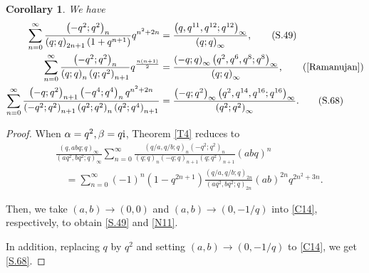 \documentclass[reqno,12pt]{amsart}
\newtheorem{corollary}[theorem]{Corollary}
\theoremstyle{remark}
\numberwithin{equation}{section}
\begin{document}
%
\begin{corollary}
We have
\begin{align}
\sum_{n=0}^{\infty}\frac{\left(-q^2;q^2\right)_n}{\left(q;q\right)_{2n+1}\left(1+q^{n+1}\right)}q^{n^2+2n}
&=\frac{\left(q,q^{11},q^{12};q^{12}\right)_{\infty}}{\left(q;q\right)_{\infty}},
\tag{S.49}
\label{S.49}\\
\sum_{n=0}^{\infty}\frac{\left(-q^2;q^2\right)_n}{\left(q;q\right)_n\left(q;q^2\right)_{n+1}}q^{\frac{n\left(n+1\right)}{2}}
&=\frac{\left(-q;q\right)_{\infty}\left(q^2,q^6,q^8;q^8\right)_{\infty}}{\left(q;q\right)_{\infty}},\tag{\rm{\cite[Entry. 1.7.5]{Ramanujan}}}\label{N11}\\
\sum_{n=0}^{\infty}\frac{\left(-q;q^2\right)_{n+1}\left(-q^4;q^4\right)_n
q^{n^2+2n}}
{\left(-q^2;q^2\right)_{n+1}\left(q^2;q^2\right)_n\left(q^2;q^4\right)_{n+1}}
&=\frac{\left(-q;q^2\right)_{\infty}\left(q^2,q^{14},q^{16};q^{16}\right)_{\infty}}
{\left(q^2;q^2\right)_{\infty}}.\tag{S.68}\label{S.68}
\end{align}
\end{corollary}
\begin{proof}
When $\alpha=q^2,\beta=q{\rm i}$, Theorem \ref{T4} reduces to 
\begin{align}
&\frac{\left(q,abq;q\right)_{\infty}}{\left(aq^2,bq^2;q\right)_{\infty}}
\sum_{n=0}^{\infty}\frac{\left(q/a,q/b;q\right)_n\left(-q^2;q^2\right)_n}
{\left(q;q\right)_{n}\left(-q;q\right)_{n+1}\left(q;q^2\right)_{n+1}}\left(abq\right)^n
\nonumber\\
&\quad=
\sum_{n=0}^{\infty}\left(-1\right)^n\left(1-q^{2n+1}\right)\frac{\left(q/a,q/b;q\right)_{2n}}
{\left(aq^2,bq^2;q\right)_{2n}}\left(ab\right)^{2n}q^{2n^2+3n}.\label{C14}
\end{align}

Then, we take $\left(a,b\right)\to\left(0,0\right)$ and  $\left(a,b\right)\to\left(0,-1/q\right)$ into \eqref{C14}, respectively,  to obtain \eqref{S.49} and \ref{N11}.

In addition, replacing $q$ by $q^2$ and  setting  $\left(a,b\right)\to\left(0,-1/q\right)$ to \eqref{C14}, we get \eqref{S.68}.
\end{proof}
\end{document}
